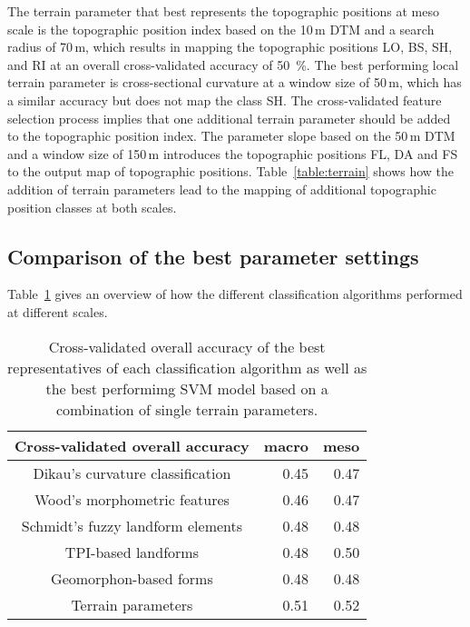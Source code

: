\documentclass[preprint,12pt,authoryear]{elsarticle}
\begin{document}
The terrain parameter that best represents the topographic positions at meso scale is the topographic position index based on the 10\,m DTM and a search radius of 70\,m, which results in mapping the topographic positions LO, BS, SH, and RI at an overall cross-validated accuracy of 50~\%. The best performing local terrain parameter is cross-sectional curvature at a window size of 50\,m, which has a similar accuracy but does not map the class SH. The cross-validated feature selection process implies that one additional terrain parameter should be added to the topographic position index. The parameter slope based on the 50\,m DTM and a window size of 150\,m introduces the topographic positions FL, DA and FS to the output map of topographic positions. Table~\ref{table:terrain} shows how the addition of terrain parameters lead to the mapping of additional topographic position classes at both scales.

\subsection{Comparison of the best parameter settings}
Table~\ref{table:overall_comparison} gives an overview of how the different classification algorithms performed at different scales.

\begin{table}[ht]
\caption{Cross-validated overall accuracy of the best representatives of each classification algorithm as well as the best performimg SVM model based on a combination of single terrain parameters.}
\centering
\begin{tabular}{crr}
  \hline
Cross-validated overall accuracy & macro   & meso \\ 
  \hline 
Dikau's curvature classification & 0.45  & 0.47 \\ 
  Wood's morphometric features & 0.46  & 0.47  \\ 
  Schmidt's fuzzy landform elements & 0.48   & 0.48  \\ 
  TPI-based landforms & 0.48  & 0.50  \\ 
  Geomorphon-based forms & 0.48   & 0.48   \\ 
  Terrain parameters & 0.51  & 0.52   \\ 
   \hline
\end{tabular}
\label{table:overall_comparison}
\end{table}
\end{document}
